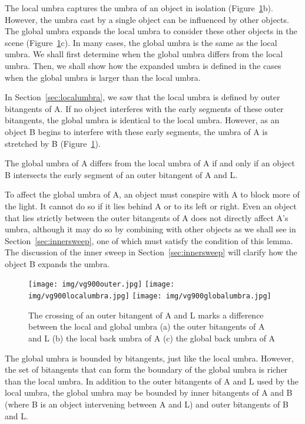 \documentclass[9pt,twocolumn]{article}
\begin{document}
The local umbra captures the umbra of an object in isolation (Figure~\ref{fig:vg900}b).
However, the umbra cast by a single object can be influenced by other objects.
The global umbra expands the local umbra to consider these other objects in the scene
(Figure~\ref{fig:vg900}c).
In many cases, the global umbra is the same as the local umbra.
We shall first determine when the global umbra differs from the local umbra.
Then, we shall show how the expanded umbra is defined in the cases when
the global umbra is larger than the local umbra.

In Section~\ref{sec:localumbra}, we saw that
the local umbra is defined by outer bitangents of A.
If no object interferes with the early segments of these outer bitangents,
the global umbra is identical to the local umbra.
However, as an object B begins to interfere with these early segments,
the umbra of A is stretched by B (Figure~\ref{fig:vg900}).

\begin{lemma}
\label{lem:differs}
The global umbra of A differs from the local umbra of A
if and only if an object B intersects the early segment
of an outer bitangent of A and L.
\end{lemma}
\prf
To affect the global umbra of A,
an object must conspire with A to block more of the light.
It cannot do so if it lies behind A or to its left or right.
Even an object that lies strictly between the outer bitangents of A
does not directly affect A's umbra, although it may do so by combining
with other objects as we shall see in Section~\ref{sec:innersweep}, 
one of which must satisfy the condition of this lemma.
The discussion of the inner sweep in Section~\ref{sec:innersweep}
will clarify how the object B expands the umbra.
\QED

\begin{figure}
\begin{center}
\texttt{[image: img/vg900outer.jpg]}
\texttt{[image: img/vg900localumbra.jpg]}
\texttt{[image: img/vg900globalumbra.jpg]}
\end{center}
\caption{The crossing of an outer bitangent of A and L 
	     marks a difference between the local and global umbra
	 (a) the outer bitangents of A and L
	 (b) the local back umbra of A
 	 (c) the global back umbra of A
}
\label{fig:vg900}
\end{figure}

The global umbra is bounded by bitangents, just like the local umbra.
However, the set of bitangents that can form the 
boundary of the global umbra is richer than the local umbra.
In addition to the outer bitangents of A and L used by the
local umbra, the global umbra may be bounded by inner bitangents of A and B
(where B is an object intervening between A and L)
and outer bitangents of B and L.
\end{document}
